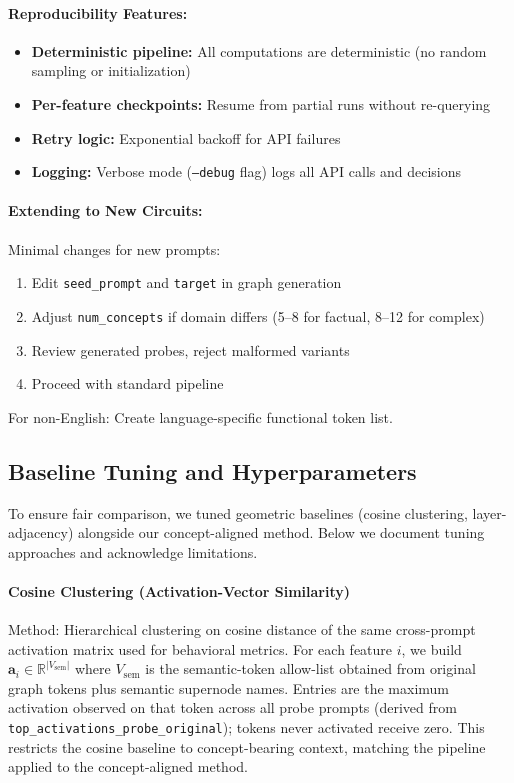 \paragraph{Reproducibility Features:}
\begin{itemize}
  \item \textbf{Deterministic pipeline:} All computations are deterministic (no random sampling or initialization)
  \item \textbf{Per-feature checkpoints:} Resume from partial runs without re-querying
  \item \textbf{Retry logic:} Exponential backoff for API failures
  \item \textbf{Logging:} Verbose mode (\texttt{--debug} flag) logs all API calls and decisions
\end{itemize}

\paragraph{Extending to New Circuits:}
Minimal changes for new prompts:
\begin{enumerate}
  \item Edit \texttt{seed\_prompt} and \texttt{target} in graph generation
  \item Adjust \texttt{num\_concepts} if domain differs (5--8 for factual, 8--12 for complex)
  \item Review generated probes, reject malformed variants
  \item Proceed with standard pipeline
\end{enumerate}

For non-English: Create language-specific functional token list.

\subsection{Baseline Tuning and Hyperparameters}
\label{sec:baseline-tuning}

To ensure fair comparison, we tuned geometric baselines (cosine clustering, layer-adjacency) alongside our concept-aligned method. Below we document tuning approaches and acknowledge limitations.

\paragraph{Cosine Clustering (Activation-Vector Similarity)}
Method: Hierarchical clustering on cosine distance of the same cross-prompt activation matrix used for behavioral metrics. For each feature $i$, we build $\mathbf{a}_i \in \mathbb{R}^{|V_{\text{sem}}|}$ where $V_{\text{sem}}$ is the semantic-token allow-list obtained from original graph tokens plus semantic supernode names. Entries are the maximum activation observed on that token across all probe prompts (derived from \texttt{top\_activations\_probe\_original}); tokens never activated receive zero. This restricts the cosine baseline to concept-bearing context, matching the pipeline applied to the concept-aligned method.


